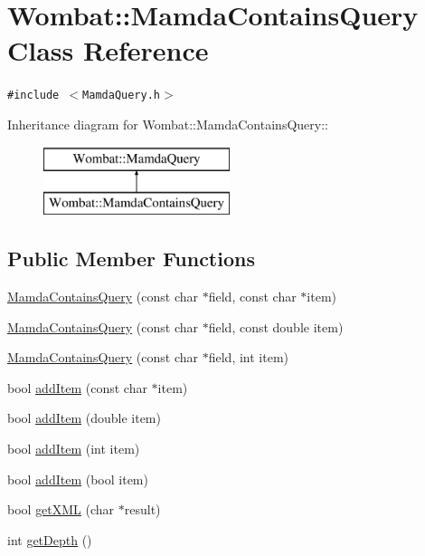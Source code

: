 \hypertarget{classWombat_1_1MamdaContainsQuery}{
\section{Wombat::Mamda\-Contains\-Query Class Reference}
\label{classWombat_1_1MamdaContainsQuery}
}
{\tt \#include $<$Mamda\-Query.h$>$}

Inheritance diagram for Wombat::Mamda\-Contains\-Query::\begin{figure}[H]
\begin{center}
\leavevmode
\includegraphics[height=2cm]{classWombat_1_1MamdaContainsQuery}
\end{center}
\end{figure}
\subsection*{Public Member Functions}
\begin{CompactItemize}
\item 
\hyperlink{classWombat_1_1MamdaContainsQuery_c70989acac6016e3f1d77cc61f2574a7}{Mamda\-Contains\-Query} (const char $\ast$field, const char $\ast$item)
\item 
\hyperlink{classWombat_1_1MamdaContainsQuery_57fbf5d8b2248852c03b2e6ce25f6358}{Mamda\-Contains\-Query} (const char $\ast$field, const double item)
\item 
\hyperlink{classWombat_1_1MamdaContainsQuery_ba0671c89ab035ce5c9c63d594a26168}{Mamda\-Contains\-Query} (const char $\ast$field, int item)
\item 
bool \hyperlink{classWombat_1_1MamdaContainsQuery_b64723071e2bf2788c31ef4ab848da31}{add\-Item} (const char $\ast$item)
\item 
bool \hyperlink{classWombat_1_1MamdaContainsQuery_30f8253e507e790ab50e2816ab508d1c}{add\-Item} (double item)
\item 
bool \hyperlink{classWombat_1_1MamdaContainsQuery_8912e36d2a3b4c4a9959014ee15f0543}{add\-Item} (int item)
\item 
bool \hyperlink{classWombat_1_1MamdaContainsQuery_75b36aa589057f0b2358e3d2a750edf7}{add\-Item} (bool item)
\item 
bool \hyperlink{classWombat_1_1MamdaContainsQuery_ba25722c7f1d89440a932b102fd276b0}{get\-XML} (char $\ast$result)
\item 
int \hyperlink{classWombat_1_1MamdaContainsQuery_4ba228d0a85b00d2cba7e162cd86951b}{get\-Depth} ()
\end{CompactItemize}


